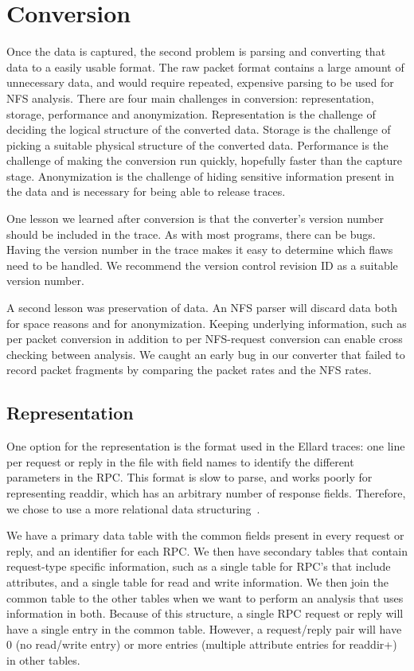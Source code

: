\section{Conversion}
\label{sec:conversion}

Once the data is captured, the second problem is parsing and
converting that data to a easily usable format.  The raw packet format
contains a large amount of unnecessary data, and would require
repeated, expensive parsing to be used for NFS analysis.  There are four main
challenges in conversion: representation, storage, performance and
anonymization.  Representation is the challenge of deciding the
logical structure of the converted data.  Storage is the challenge of
picking a suitable physical structure of the converted data.
Performance is the challenge of making the conversion run quickly,
hopefully faster than the capture stage.  Anonymization is the
challenge of hiding sensitive information present in the data and is
necessary for being able to release traces.

One lesson we learned after conversion is that the converter's version
number should be included in the trace.  As with most programs, there
can be bugs.  Having the version number in the trace makes it easy to
determine which flaws need to be handled.  We recommend the version
control revision ID as a suitable version number.  

A second lesson was
preservation of data.  An NFS parser will discard data both for space
reasons and for anonymization.  Keeping underlying information, such as
per packet conversion in addition to per NFS-request conversion can
enable cross checking between analysis.  We caught an early bug in our
converter that failed to record packet fragments by comparing the
packet rates and the NFS rates.  

\subsection{Representation}

One option for the representation is the format used in the
Ellard\cite{ellardTraces} traces: one line per request or reply in the
file with field names to identify the different parameters in the RPC.
This format is slow to parse, and works poorly for representing 
readdir, which has an arbitrary number of response fields.
Therefore, we chose to use a more relational data
structuring~\cite{codd70relational}.  

We have a primary data table with the common fields present in every
request or reply, and an identifier for each RPC.  We then have
secondary tables that contain request-type specific information, such
as a single table for RPC's that include attributes, and a single
table for read and write information.  We then join the common table
to the other tables when we want to perform an analysis that uses
information in both.  Because of this structure, a single RPC request
or reply will have a single entry in the common table.  However, a
request/reply pair will have 0 (no read/write entry) or more
entries (multiple attribute entries for readdir+) in other tables.

